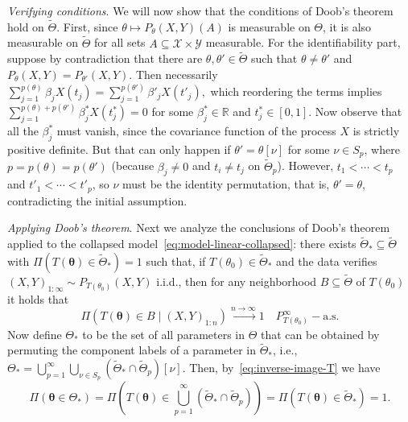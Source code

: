 \documentclass{article}
\numberwithin{equation}{section}
\theoremstyle{plain}
\newcommand{\R}{\mathbb{R}}
\newcommand{\tTheta}{\tilde{\Theta}}
\begin{document}
\textit{Verifying conditions}. We will now show that the conditions of Doob's theorem hold on \(\tTheta\). First, since \(\theta \mapsto P_\theta(X, Y)(A)\) is measurable on \(\Theta\), it is also measurable on \(\tTheta\) for all sets \(A\subseteq \mathcal X \times \mathcal Y\) measurable. For the identifiability part, suppose by contradiction that there are \(\theta,\theta' \in \tTheta\) such that \(\theta\neq \theta'\) and \(P_{\theta}(X, Y) = P_{\theta'}(X, Y)\). Then necessarily
\(
\sum_{j=1}^{p(\theta)} \beta_j X(t_j) = \sum_{j=1}^{p(\theta')} \beta'_j X(t'_j),
\)
which reordering the terms implies \(\sum_{j=1}^{p(\theta)+p(\theta')} \beta^*_j X(t_j^*)=0\) for some \(\beta_j^*\in \R\) and \(t^*_j\in [0,1]\). Now observe that all the \(\beta_j^*\) must vanish, since the covariance function of the process \(X\) is strictly positive definite. But that can only happen if \(\theta'=\theta[\nu]\) for some \(\nu \in S_p\), where \(p=p(\theta)=p(\theta')\) (because \(\beta_j\neq 0\) and \(t_i\neq t_j\) on \(\tTheta_p\)). However, \(t_1< \cdots < t_p\) and \(t'_1 < \cdots < t'_p\), so  \(\nu\) must be the identity permutation, that is, \(\theta'=\theta\), contradicting the initial assumption.

\textit{Applying Doob's theorem}. Next we analyze the conclusions of Doob's theorem applied to the collapsed model~\eqref{eq:model-linear-collapsed}: there exists \(\tTheta_* \subseteq \tTheta\) with \(\Pi(T(\bm\theta)\in\tTheta_*)=1\) such that, if \(T(\theta_0)\in \tTheta_*\) and the data verifies \((X,Y)_{1:\infty} \sim P_{T(\theta_0)}(X, Y)\) i.i.d., then for any neighborhood \(B\subseteq \tTheta\) of \(T(\theta_0)\) it holds that
\begin{equation}\label{eq:consistency-collapsed}
  \Pi(T(\bm\theta) \in B \mid (X,Y)_{1:n}) \xrightarrow[]{n\to\infty} 1 \quad P_{T(\theta_0)}^\infty-\text{a.s.}
\end{equation}
Now define \(\Theta_*\) to be the set of all parameters in \(\Theta\) that can be obtained by permuting the component labels of a parameter in \(\tTheta_*\), i.e., \(\Theta_* = \bigcup_{p=1}^\infty \bigcup_{\nu\in S_p}(\tTheta_* \cap \tTheta_p)[\nu]\). Then, by~\eqref{eq:inverse-image-T} we have \[
  \Pi(\bm\theta\in \Theta_*) = \Pi\left(T(\bm\theta) \in \bigcup_{p=1}^\infty (\tTheta_*\cap \tTheta_p)\right) = \Pi(T(\bm\theta)\in \tTheta_*) = 1.\]
\end{document}
